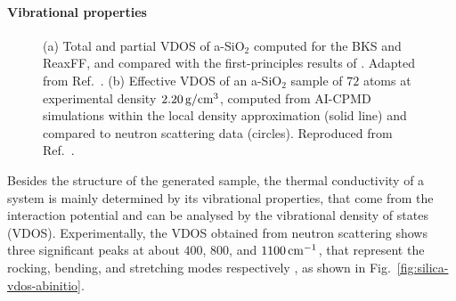 \paragraph{Vibrational properties}
\begin{figure}[!tb]
    \centering
    \caption{
    (a) Total and partial VDOS of a-SiO$_2$ computed for the BKS and ReaxFF, and compared with the first-principles results of \citet{Bhattarai2016}. Adapted from Ref.~\cite{Tian2017}.
    (b) Effective VDOS of an a-SiO$_2$ sample of $72$ atoms at experimental density $2.20\,\mathrm{g/cm^3}$, computed from AI-CPMD simulations within the local density approximation (solid line) and compared to neutron scattering data (circles). Reproduced from Ref.~\cite{Sarnthein1997}.}
\end{figure}

Besides the structure of the generated sample, the thermal conductivity of a system is mainly determined by its vibrational properties, that come from the interaction potential and can be analysed by the vibrational density of states (VDOS).
Experimentally, the VDOS obtained from neutron scattering shows three significant peaks at about $400$, $800$, and $1100\,\mathrm{cm^{-1}}$, that represent the rocking, bending, and stretching modes respectively \cite{Galeener1983}, as shown in Fig.~\ref{fig:silica-vdos-abinitio}.


